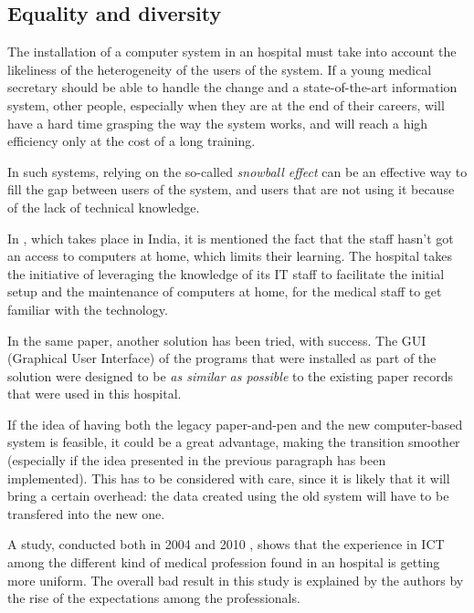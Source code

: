 \documentclass[a4paper,10pt]{article}
\begin{document}
\begin{multicols}{2}
\section{Equality and diversity}

The installation of a computer system in an hospital must take into account the
likeliness of the heterogeneity of the users of the system. If a young medical
secretary should be able to handle the change and a state-of-the-art
information system, other people, especially when they are at the end of their
careers, will have a hard time grasping the way the system works, and will
reach a high efficiency only at the cost of a long training.

In such systems, relying on the so-called \emph{snowball effect} can be an
effective way to fill the gap between users of the system, and users that are
not using it because of the lack of technical knowledge.

In \cite{IndiaEMR}, which takes place in India, it is mentioned the fact
that the staff hasn't got an access to computers at home, which limits their
learning. The hospital takes the initiative of leveraging the knowledge of its
IT staff to facilitate the initial setup and the maintenance of computers at
home, for the medical staff to get familiar with the technology.

In the same paper, another solution has been tried, with success. The GUI
(Graphical User Interface) of the programs that were installed as part of the
solution were designed to be \emph{as similar as possible} to the existing paper
records that were used in this hospital.

If the idea of having both the legacy paper-and-pen and the new computer-based
system is feasible, it could be a great advantage, making the transition
smoother (especially if the idea presented in the previous paragraph has been
implemented). This has to be considered with care, since it is likely that it
will bring a certain overhead: the data created using the old system will have
to be transfered into the new one.

A study, conducted both in 2004 and 2010 \cite{UsersAward2}, shows that the
experience in ICT among the different kind of medical profession found in an
hospital is getting more uniform. The overall bad result in this study is
explained by the authors by the rise of the expectations among the professionals.





\end{multicols}
\end{document}
